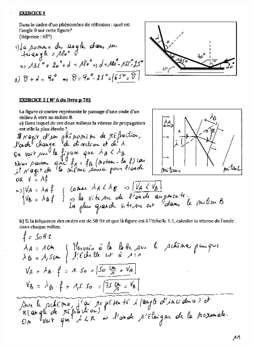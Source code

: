 \includegraphics[width=18.501cm,height=25.636cm]{Pictures/100000010000026D0000035C988B6F7E90298C6A.png}

